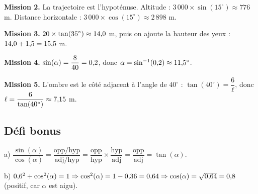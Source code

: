 \documentclass[../main.tex]{subfiles}
\begin{document}
\textbf{Mission 2.} La trajectoire est l'hypoténuse.
Altitude : $3\,000 \times \sin(15^\circ) \approx 776$ m. \quad Distance horizontale : $3\,000 \times \cos(15^\circ) \approx 2\,898$ m.

\textbf{Mission 3.} $20 \times \tan(35^\circ) \approx 14{,} 0$ m, puis on ajoute la hauteur des yeux : $14{,} 0 + 1{,} 5 = 15{,} 5$ m.

\textbf{Mission 4.} $\sin(\alpha) = \dfrac{8}{40} = 0{,} 2$, donc $\alpha = \sin^{-1}(0{,} 2) \approx 11{,} 5^\circ$.

\textbf{Mission 5.} L'ombre est le côté adjacent à l'angle de $40^\circ$ : $\tan(40^\circ) = \dfrac{6}{\ell}$, donc $\ell = \dfrac{6}{\tan(40^\circ)} \approx 7{,} 15$ m.

\subsection*{Défi bonus}

a) $\dfrac{\sin(\alpha)}{\cos(\alpha)} = \dfrac{\text{opp}/\text{hyp}}{\text{adj}/\text{hyp}} = \dfrac{\text{opp}}{\text{hyp}} \times \dfrac{\text{hyp}}{\text{adj}} = \dfrac{\text{opp}}{\text{adj}} = \tan(\alpha)$.

b) $0{,} 6^2 + \cos^2(\alpha) = 1 \Rightarrow \cos^2(\alpha) = 1 - 0{,} 36 = 0{,} 64 \Rightarrow \cos(\alpha) = \sqrt{0{,} 64} = 0{,} 8$ (positif, car $\alpha$ est aigu).
\end{document}
